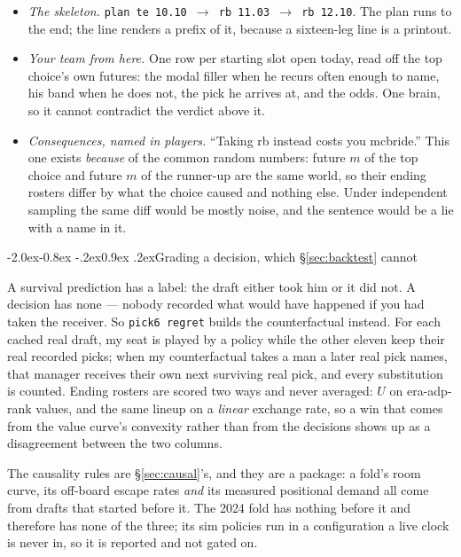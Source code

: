 \documentclass[10pt,a4paper]{article}
\makeatletter
\theoremstyle{plain}
\theoremstyle{definition}
\theoremstyle{remark}
\newcommand{\code}[1]{\texttt{\small #1}}
\renewcommand\subsection{\@startsection{subsection}{2}{\z@}%
  {-2.0ex\@plus -0.8ex \@minus -.2ex}{0.9ex \@plus .2ex}{\normalfont\large\bfseries}}
\makeatother
\begin{document}
\begin{itemize}
\item \emph{The skeleton.} \code{plan te 10.10 $\to$ rb 11.03 $\to$ rb 12.10}. The plan
runs to the end; the line renders a prefix of it, because a sixteen-leg line is a printout.
\item \emph{Your team from here.} One row per starting slot open today, read off the top
choice's own futures: the modal filler when he recurs often enough to name, his band when
he does not, the pick he arrives at, and the odds. One brain, so it cannot contradict the
verdict above it.
\item \emph{Consequences, named in players.} ``Taking rb instead costs you mcbride.'' This
one exists \emph{because} of the common random numbers: future $m$ of the top choice and
future $m$ of the runner-up are the same world, so their ending rosters differ by what the
choice caused and nothing else. Under independent sampling the same diff would be mostly
noise, and the sentence would be a lie with a name in it.
\end{itemize}

\subsection{Grading a decision, which \texorpdfstring{\S\ref{sec:backtest}}{the backtest} cannot}
\label{sec:regret}

A survival prediction has a label: the draft either took him or it did not. A decision has
none --- nobody recorded what would have happened if you had taken the receiver. So
\code{pick6 regret} builds the counterfactual instead. For each cached real draft, my seat
is played by a policy while the other eleven keep their real recorded picks; when my
counterfactual takes a man a later real pick names, that manager receives their own next
surviving real pick, and every substitution is counted. Ending rosters are scored two ways
and never averaged: $U$ on era-adp-rank values, and the same lineup on a \emph{linear}
exchange rate, so a win that comes from the value curve's convexity rather than from the
decisions shows up as a disagreement between the two columns.

The causality rules are \S\ref{sec:causal}'s, and they are a package: a fold's room curve,
its off-board escape rates \emph{and} its measured positional demand all come from drafts
that started before it. The 2024 fold has nothing before it and therefore has none of the
three; its sim policies run in a configuration a live clock is never in, so it is reported
and not gated on.
\end{document}
